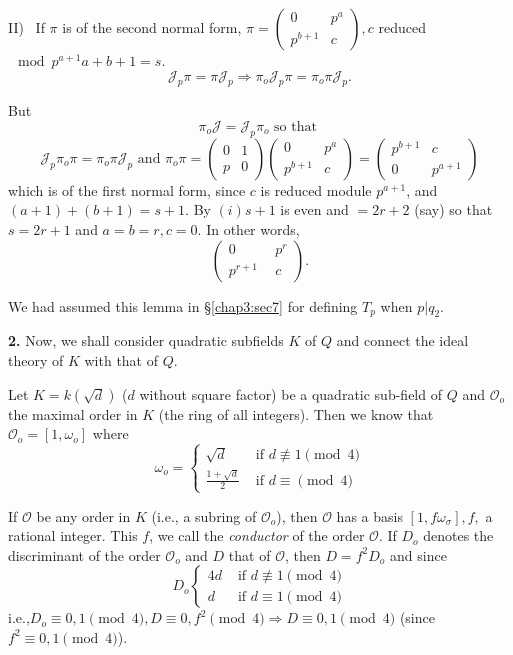 II)~ If $\pi$ is of the second normal form, $\pi = \begin{pmatrix}0
  & p^a \\ p^{b + 1} & c \end{pmatrix}, c$ reduced $\mod p^{a + 1} a +
b + 1 = s$. 
$$ 
\mathcal{J}_p \pi = \pi \mathcal{J}_p \Longrightarrow \pi_o
\mathcal{J}_p \pi = \pi_o \pi \mathcal{J}_p. 
$$

But\pageoriginale
$$
\pi_o \mathcal{J} = \mathcal{J}_p \pi_o \text { so that }
$$
$$
\mathcal{J}_p \pi_o \pi = \pi_o \pi \mathcal{J}_p \text { and } \pi_o
\pi = \begin{pmatrix} 0 & 1 \\ p & 0 \end{pmatrix} \begin{pmatrix} 0 &
  p^a \\ p^{b + 1} & c \end{pmatrix} = \begin{pmatrix} p^{b + 1} & c
  \\ 0 & p^{a + 1} \end{pmatrix} 
$$
which is of the first normal form, since $c$ is reduced module $p^{a
  + 1}$, and $(a + 1) + (b + 1) = s + 1$. By $(i) s + 1$ is even and $
=  2r + 2$ (say) so that $s = 2r + 1$ and $a = b = r, c = 0$. In other
words, 
$$
\begin{pmatrix} 0 ~&~ p^r \\ p^{r + 1} ~&~ c \end{pmatrix}.
$$

\begin{note}
  We had assumed this lemma in \S \ref{chap3:sec7} for defining $T_p$
  when $p | q_2$. 
\end{note}

\textbf{2.} Now, we shall consider quadratic subfields $K$ of $Q$ and connect
the ideal theory of $K$ with that of $Q$. 

Let $K = k (\sqrt{d})$ ($d$ without square factor) be a quadratic
sub-field of $Q$ and $\mathscr{O}_o$ the maximal order in $K$ (the
ring of all integers). Then we know that $\mathscr{O}_o = [1,
  \omega_o]$ where 
$$ 
\omega_o = 
\begin{cases}
  \sqrt{d} &\text { if } d \nequiv 1 \pmod 4\\
  \frac{1 + \sqrt{d}}{2} &\text { if } d \equiv \pmod 4
\end{cases}
$$

If $\mathscr{O}$ be any order in $K$ (i.e., a subring of
$\mathscr{O}_o $), then $\mathscr{O}$ has a basis $[1, f \omega_\sigma], f,
$ a rational integer. This $f$, we call the \textit{conductor} of the
order $\mathscr{O}$. If $D_o$ denotes the discriminant of the order
$\mathscr{O}_o$ and $D$ that of $\mathscr{O}$, then $D = f^2 D_o$ and
since 
$$
D_o
\begin{cases}
  4d &\text{ if }  d \nequiv 1 \pmod 4\\
  d &\text { if } d \equiv 1 \pmod 4 
\end{cases}
$$
i.e.,\pageoriginale $D_o \equiv 0, 1 \pmod 4, D \equiv 0, f^2 \pmod 4
\Longrightarrow D \equiv 0, 1 \pmod 4$ (since $f^2 \equiv 0, 1 \pmod
4$). 

